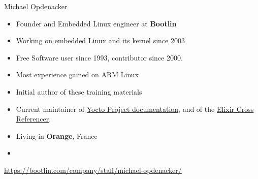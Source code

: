 \begin{frame}{Michael Opdenacker}
    \begin{itemize}
	\item Founder and Embedded Linux engineer at {\bf Bootlin}
	\item Working on embedded Linux and its kernel since 2003
	\item Free Software user since 1993, contributor since 2000.
	\item Most experience gained on ARM Linux
	\item Initial author of these training materials
        \item Current maintainer of
              \href{https://docs.yoctoproject.org/}{Yocto Project documentation},
	      and of the \href{https://github.com/bootlin/elixir}{Elixir Cross Referencer}.
	\item Living in {\bf Orange}, France
	\item {}
    \end{itemize}
    {\small \url{https://bootlin.com/company/staff/michael-opdenacker/}}
\end{frame}
